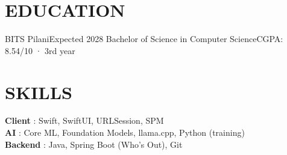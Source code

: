 \section{EDUCATION}
  \resumeSubHeadingListStart
    \resumeSubheading
      {BITS Pilani}{Expected 2028}
      {Bachelor of Science in Computer Science}{CGPA: 8.54/10 · 3rd year}
  \resumeSubHeadingListEnd

\section{SKILLS}
 \begin{itemize}[leftmargin=0in, label={}]
    \small{\item{
     \textbf{Client} {: Swift, SwiftUI, URLSession, SPM} \vspace{1pt} \\
     \textbf{AI} {: Core ML, Foundation Models, llama.cpp, Python (training)} \vspace{1pt} \\
     \textbf{Backend} {: Java, Spring Boot (Who's Out), Git}
    }}
 \end{itemize}


